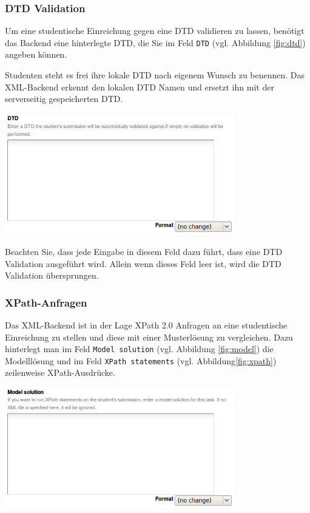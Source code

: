 \documentclass[a4paper]{scrartcl}
\newcommand{\anf}[1]{\glqq{}#1\grqq{}}
\begin{document}
  	  \subsubsection{DTD Validation}
  	  Um eine studentische Einreichung gegen eine DTD validieren zu lassen, benötigt das Backend eine hinterlegte DTD, die Sie im Feld \anf{\texttt{DTD}} (vgl. Abbildung \ref{fig:dtd}) angeben können.
  	  
  	  Studenten steht es frei ihre lokale DTD nach eigenem Wunsch zu benennen. Das XML-Backend erkennt den lokalen DTD Namen und ersetzt ihn mit der serverseitig gespeicherten DTD.
  	  \begin{center}
	      \includegraphics[width=0.75\textwidth]{images/DTD.png}
	      \label{fig:dtd}
      \end{center}
  	  Beachten Sie, dass jede Eingabe in diesem Feld dazu führt, dass eine DTD Validation ausgeführt wird. Allein wenn dieses Feld leer ist, wird die DTD Validation übersprungen.
  	  
  	  \subsubsection{XPath-Anfragen}
  	  Das XML-Backend ist in der Lage XPath 2.0 Anfragen an eine studentische Einreichung zu stellen und diese mit einer Musterlösung zu vergleichen. Dazu hinterlegt man im Feld \anf{\texttt{Model solution}} (vgl. Abbildung \ref{fig:model}) die Modelllösung und im Feld \anf{\texttt{XPath statements}} (vgl. Abbildung\ref{fig:xpath}) zeilenweise XPath-Ausdrücke.
  	  
  	  \begin{center}
	      \includegraphics[width=0.75\textwidth]{images/Model.png}
	      \label{fig:model}
      \end{center}
      
\end{document}
